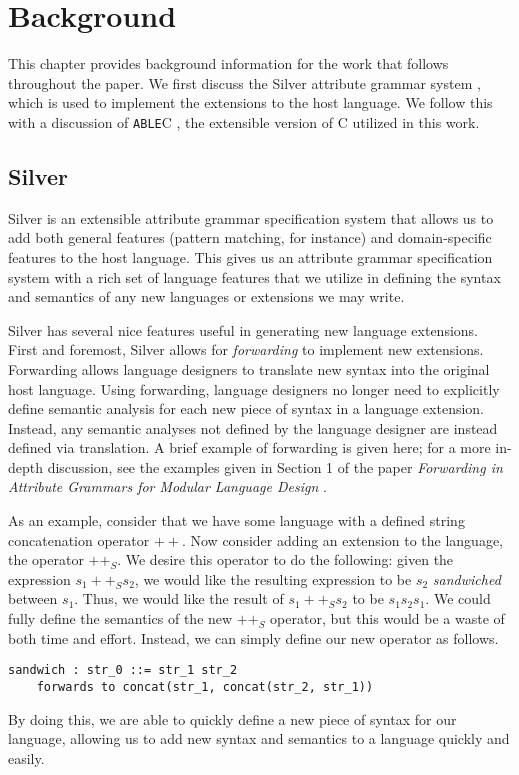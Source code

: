 \documentclass[main.tex]{subfiles}
\begin{document}
\section{Background}

This chapter provides background information for the work that follows
throughout the paper. We first discuss the Silver attribute grammar system 
\cite{3}, which is used to implement the extensions to the host language.
We follow this with a discussion of \verb|ABLE|C \cite{8}, the extensible
version of C utilized in this work.

\subsection{Silver} %
Silver \cite{3} is an extensible attribute grammar specification system that allows us to 
add both general features (pattern matching, for instance) and domain-specific features
to the host language. This gives us an attribute grammar specification system with a rich
set of language features that we utilize in defining the syntax and semantics of any new 
languages or extensions we may write.

Silver has several nice features useful in generating new language extensions.
First and foremost, Silver allows for \emph{forwarding} \cite{4} to 
implement new extensions. Forwarding allows language
designers to translate new syntax into the original host language. Using forwarding,
language designers no longer need to explicitly define semantic analysis for each new
piece of syntax in a language extension. Instead, any semantic analyses not defined
by the language designer are instead defined via translation. A brief example of forwarding is 
given here; for a more in-depth discussion, see the examples given in Section 1 of the paper 
\emph{Forwarding in Attribute Grammars for Modular Language Design} \cite{4}.

As an example, consider that we have some language with a defined string concatenation operator $++$.
Now consider adding an extension to the language, the operator $++_S$. We desire this operator to do
the following: given the expression $s_1 ++_S s_2$, we would like the resulting expression to be $s_2$
\emph{sandwiched} between $s_1$. Thus, we would like the result of $s_1 ++_S s_2$ to be $s_1 s_2 s_1$.
We could fully define the semantics of the new $++_S$ operator, but this would be a waste of both time and
effort. Instead, we can simply define our new operator as follows.
\begin{lstlisting}
sandwich : str_0 ::= str_1 str_2
	forwards to concat(str_1, concat(str_2, str_1))
\end{lstlisting}
By doing this, we are able to quickly define a new piece of syntax for our language, allowing us to add new
syntax and semantics to a language quickly and easily.
\end{document}
